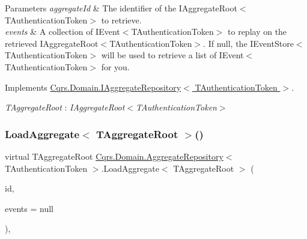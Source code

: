 \begin{DoxyParams}{Parameters}
{\em aggregate\+Id} & The identifier of the I\+Aggregate\+Root$<$\+T\+Authentication\+Token$>$ to retrieve.\\
\hline
{\em events} & A collection of I\+Event$<$\+T\+Authentication\+Token$>$ to replay on the retrieved I\+Aggregate\+Root$<$\+T\+Authentication\+Token$>$. If null, the I\+Event\+Store$<$\+T\+Authentication\+Token$>$ will be used to retrieve a list of I\+Event$<$\+T\+Authentication\+Token$>$ for you. \\
\hline
\end{DoxyParams}


Implements \hyperlink{interfaceCqrs_1_1Domain_1_1IAggregateRepository_a890633fddbd05bd3b9e9968a2de095bb_a890633fddbd05bd3b9e9968a2de095bb}{Cqrs.\+Domain.\+I\+Aggregate\+Repository$<$ T\+Authentication\+Token $>$}.

\begin{Desc}
\item[Type Constraints]\begin{description}
\item[{\em T\+Aggregate\+Root} : {\em I\+Aggregate\+Root$<$T\+Authentication\+Token$>$}]\end{description}
\end{Desc}
\mbox{\label{classCqrs_1_1Domain_1_1AggregateRepository_a53bf020a5f2a0f697f361065b792cf61_a53bf020a5f2a0f697f361065b792cf61}} 
\subsubsection{\texorpdfstring{Load\+Aggregate$<$ T\+Aggregate\+Root $>$()}{LoadAggregate< TAggregateRoot >()}}
{\footnotesize\ttfamily virtual T\+Aggregate\+Root \hyperlink{classCqrs_1_1Domain_1_1AggregateRepository}{Cqrs.\+Domain.\+Aggregate\+Repository}$<$ T\+Authentication\+Token $>$.Load\+Aggregate$<$ T\+Aggregate\+Root $>$ (\begin{DoxyParamCaption}\item[{Guid}]{id,  }\item[{I\+List$<$ \hyperlink{interfaceCqrs_1_1Events_1_1IEvent}{I\+Event}$<$ T\+Authentication\+Token $>$$>$}]{events = {\ttfamily null} }\end{DoxyParamCaption})\hspace{0.3cm}{\ttfamily [protected]}, {\ttfamily [virtual]}}



